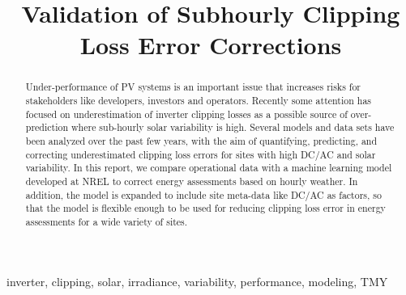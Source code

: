 \documentclass[conference]{IEEEtran}
\begin{document}
\title{Validation of Subhourly Clipping Loss Error Corrections}

\author{
    }

\maketitle

\begin{abstract}
Under-performance of PV systems is an important issue that increases risks for stakeholders like developers, investors and operators. Recently some attention has focused on underestimation of inverter clipping losses as a possible source of over-prediction where sub-hourly solar variability is high. Several models and data sets have been analyzed over the past few years, with the aim of quantifying, predicting, and correcting underestimated clipping loss errors for sites with high DC/AC and solar variability. In this report, we compare operational data with a machine learning model developed at NREL to correct energy assessments based on hourly weather. In addition, the model is expanded to include site meta-data like DC/AC as factors, so that the model is flexible enough to be used for reducing clipping loss error in energy assessments for a wide variety of sites. 
\end{abstract}

\begin{IEEEkeywords}
inverter, clipping, solar, irradiance, variability, performance, modeling, TMY
\end{IEEEkeywords}
\end{document}
